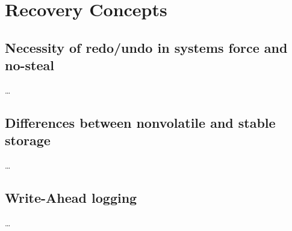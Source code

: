 
\section{Recovery Concepts}

\subsection{Necessity of redo/undo in systems force and no-steal}
\dots

\subsection{Differences between nonvolatile and stable storage}
\dots

\subsection{Write-Ahead logging}
\dots
